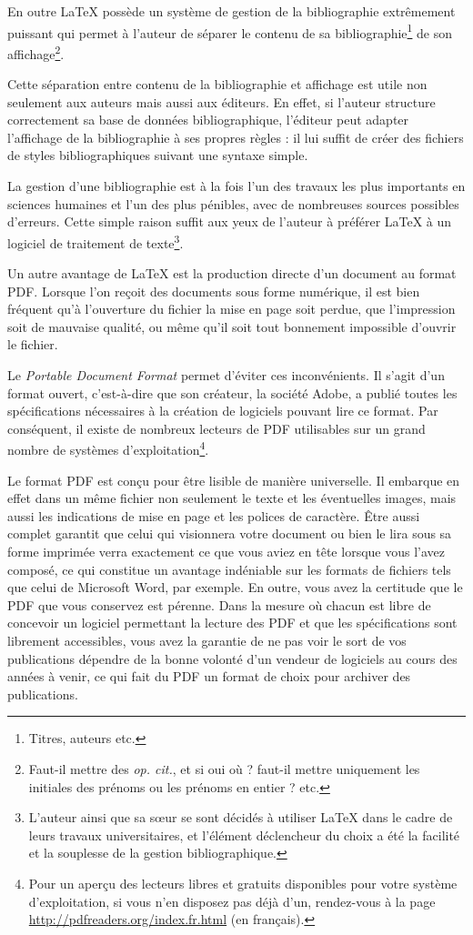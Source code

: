 En outre \LaTeX{} possède un système de gestion de la bibliographie extrêmement puissant qui permet à l'auteur de séparer le contenu de sa bibliographie\footnote{Titres, auteurs etc.} de son affichage\footnote{Faut-il mettre des \emph{op. cit.}, et si oui où ? faut-il mettre uniquement les initiales des prénoms ou les prénoms en entier ? etc.}.

Cette séparation entre contenu de la bibliographie et affichage est utile non seulement aux auteurs mais aussi aux éditeurs. En effet, si l'auteur structure correctement sa base de données bibliographique, l'éditeur peut adapter l'affichage de la bibliographie à ses propres règles : il lui suffit de créer des fichiers de styles bibliographiques suivant une syntaxe simple.

La gestion d'une bibliographie est à la fois l'un des travaux les plus importants en sciences humaines et l'un des plus pénibles, avec de nombreuses sources possibles d'erreurs. Cette simple raison suffit aux yeux de l'auteur à préférer \LaTeX{} à un logiciel de traitement de texte\footnote{L'auteur ainsi que sa sœur se sont décidés à utiliser \LaTeX{} dans le cadre de leurs travaux universitaires, et l'élément déclencheur du choix a été la facilité et la souplesse de la gestion bibliographique.}.

Un autre avantage de \LaTeX{} est la production directe d'un document au format PDF. Lorsque l'on reçoit des documents sous forme numérique, il est bien fréquent qu'à l'ouverture du fichier la mise en page soit perdue, que l'impression soit de mauvaise qualité, ou même qu'il soit tout bonnement impossible d'ouvrir le fichier.

Le \emph{\textenglish{Portable Document Format}} permet d'éviter ces inconvénients. Il s'agit d'un format ouvert, c'est-à-dire que son créateur, la société Adobe, a publié toutes les spécifications nécessaires à la création de logiciels pouvant lire ce format. Par conséquent, il existe de nombreux lecteurs de PDF utilisables sur un grand nombre de systèmes d'exploitation\footnote{Pour un aperçu des lecteurs libres et gratuits disponibles pour votre système d'exploitation, si vous n'en disposez pas déjà d'un, rendez-vous à la page \url{http://pdfreaders.org/index.fr.html} (en français).}.

Le format PDF est conçu pour être lisible de manière universelle. Il embarque en effet dans un même fichier non seulement le texte et les éventuelles images, mais aussi les indications de mise en page et les polices de caractère. Être aussi complet  garantit que celui qui visionnera votre document ou bien le lira sous sa forme imprimée verra exactement ce que vous aviez en tête lorsque vous l'avez composé, ce qui constitue un avantage indéniable sur les formats de fichiers tels que celui de Microsoft Word, par exemple. En outre, vous avez la certitude que le PDF que vous conservez est pérenne. Dans la mesure où chacun est libre de concevoir un logiciel permettant la lecture des PDF et que les spécifications sont librement accessibles, vous avez la garantie de ne pas voir le sort de vos publications dépendre de la bonne volonté d'un vendeur de logiciels au cours des années à venir, ce qui fait du PDF un format de choix pour archiver des publications.

